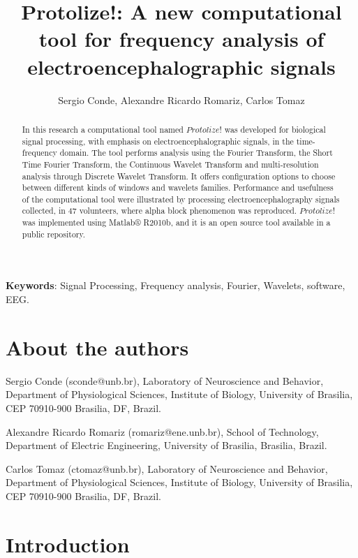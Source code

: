 \documentclass[12pt, a4paper]{article}
\begin{document}
\title{Protolize!: A new computational tool for frequency analysis of electroencephalographic signals}
\author{Sergio Conde, Alexandre Ricardo Romariz, Carlos Tomaz}
\date{}
\maketitle

\begin{abstract}

In this research a computational tool named $Protolize!$ was developed for biological signal processing, with emphasis on electroencephalographic signals, in the time-frequency domain. The tool performs analysis using the Fourier Transform, the Short Time Fourier Transform, the Continuous Wavelet Transform and multi-resolution analysis through Discrete Wavelet Transform. It offers configuration options to choose between different kinds of windows and wavelets families. Performance and usefulness of the computational tool were illustrated by processing electroencephalography signals collected, in 47 volunteers, where alpha block phenomenon was reproduced. $Protolize!$ was implemented using Matlab® R2010b, and it is an open source tool available in a public repository.

\end{abstract}

\textbf{Keywords}: Signal Processing, Frequency analysis, Fourier, Wavelets, software, EEG.

\section{About the authors}

Sergio Conde (sconde@unb.br), Laboratory of Neuroscience and Behavior, Department of Physiological Sciences, Institute of Biology, University of Brasilia, CEP 70910-900 Brasilia, DF,  Brazil.

Alexandre Ricardo Romariz (romariz@ene.unb.br), School of Technology, Department of Electric Engineering, University of Brasilia, Brasilia, Brazil.

Carlos Tomaz (ctomaz@unb.br), Laboratory of Neuroscience and Behavior, Department of Physiological Sciences, Institute of Biology, University of Brasilia, CEP 70910-900 Brasilia, DF,  Brazil.

\section{Introduction}
\end{document}
